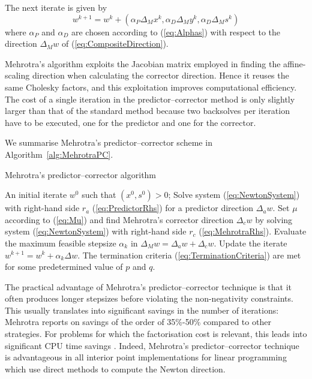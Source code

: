 The next iterate is given by
\[
w^{k+1} = w^k
        + (\alpha_P\Delta_M x^k,\alpha_D\Delta_M y^k,\alpha_D\Delta_M s^k)
\]
where $\alpha_P$ and $\alpha_D$ are chosen according to (\ref{eq:Alphas})
with respect to the direction $\Delta_M w$ of (\ref{eq:CompositeDirection}).

Mehrotra's algorithm exploits the Jacobian matrix employed in 
finding the affine-scaling direction when calculating 
the corrector direction. Hence it reuses the same Cholesky factors,
and this exploitation improves computational efficiency.
The cost of a single iteration in the predictor--corrector 
method is only slightly larger than that of the standard 
method because two backsolves per iteration have to be executed, 
one for the predictor and one for the corrector. 

We summarise Mehrotra's predictor--corrector scheme in
Algorithm~\ref{alg:MehrotraPC}.
\begin{algorithm}[ht]
  \caption{Mehrotra's predictor--corrector algorithm}
    \begin{algorithmic}[0]  \label{alg:MehrotraPC}
      \REQUIRE An initial iterate $w^0$ such that $(x^0, s^0) > 0$;
      \smallskip
      \REPEAT
        \STATE Solve system (\ref{eq:NewtonSystem}) with right-hand side $r_a$
	       (\ref{eq:PredictorRhs}) for a predictor direction $\Delta_a w$.
        \smallskip
        \STATE Set $\mu$ according to (\ref{eq:Mu}) and find Mehrotra's
               corrector direction $\Delta_c w$ by solving system
               (\ref{eq:NewtonSystem}) with right-hand side $r_c$
               (\ref{eq:MehrotraRhs}).
        \smallskip
        \STATE Evaluate the maximum feasible stepsize $\alpha_k$ in
               $\Delta_M w = \Delta_a w + \Delta_c w$.
        \smallskip
        \STATE Update the iterate $w^{k+1} = w^k + \alpha_k\Delta w$.
        \smallskip
      \UNTIL The termination criteria (\ref{eq:TerminationCriteria}) are met
             for some predetermined value of $p$ and $q$.
  \end{algorithmic}
\end{algorithm}

The practical advantage of Mehrotra's predictor--corrector technique
is that it often produces longer stepsizes before violating the 
non-negativity constraints.
%
This usually translates into significant savings in the number of 
iterations: Mehrotra \cite{Mehrotra92} reports on savings of the
order of 35\%-50\% compared to other strategies.
For problems for which the factorisation cost is relevant, this
leads into significant 
CPU time savings \cite{LustigMarstenShanno,Mehrotra92}. Indeed, 
Mehrotra's predictor--corrector technique is advantageous in all 
interior point implementations for linear programming 
which use direct methods to compute 
the Newton direction.

